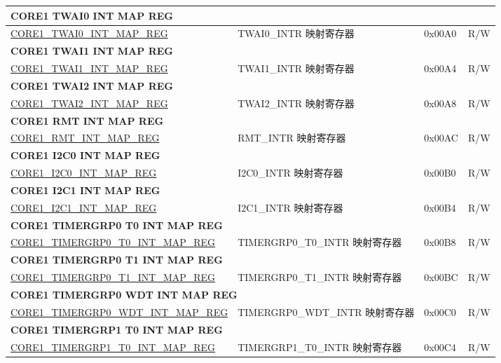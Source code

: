 \begin{longtable}{ | p{7.5cm} | p{7.2cm} | p{1.3cm} | p{1cm} | }
\multicolumn{4}{|l|}{\textbf{CORE1 TWAI0 INT MAP REG}} \\ \hline
\hyperref[regdesc:CORE1TWAI0INTMAPREG]{CORE1\_TWAI0\_INT\_MAP\_REG} & TWAI0\_INTR 映射寄存器 & 0x00A0 & R/W \\ \hline
\multicolumn{4}{|l|}{\textbf{CORE1 TWAI1 INT MAP REG}} \\ \hline
\hyperref[regdesc:CORE1TWAI1INTMAPREG]{CORE1\_TWAI1\_INT\_MAP\_REG} & TWAI1\_INTR 映射寄存器 & 0x00A4 & R/W \\ \hline
\multicolumn{4}{|l|}{\textbf{CORE1 TWAI2 INT MAP REG}} \\ \hline
\hyperref[regdesc:CORE1TWAI2INTMAPREG]{CORE1\_TWAI2\_INT\_MAP\_REG} & TWAI2\_INTR 映射寄存器 & 0x00A8 & R/W \\ \hline
\multicolumn{4}{|l|}{\textbf{CORE1 RMT INT MAP REG}} \\ \hline
\hyperref[regdesc:CORE1RMTINTMAPREG]{CORE1\_RMT\_INT\_MAP\_REG} & RMT\_INTR 映射寄存器 & 0x00AC & R/W \\ \hline
\multicolumn{4}{|l|}{\textbf{CORE1 I2C0 INT MAP REG}} \\ \hline
\hyperref[regdesc:CORE1I2C0INTMAPREG]{CORE1\_I2C0\_INT\_MAP\_REG} & I2C0\_INTR 映射寄存器 & 0x00B0 & R/W \\ \hline
\multicolumn{4}{|l|}{\textbf{CORE1 I2C1 INT MAP REG}} \\ \hline
\hyperref[regdesc:CORE1I2C1INTMAPREG]{CORE1\_I2C1\_INT\_MAP\_REG} & I2C1\_INTR 映射寄存器 & 0x00B4 & R/W \\ \hline
\multicolumn{4}{|l|}{\textbf{CORE1 TIMERGRP0 T0 INT MAP REG}} \\ \hline
\hyperref[regdesc:CORE1TIMERGRP0T0INTMAPREG]{CORE1\_TIMERGRP0\_T0\_INT\_MAP\_REG} & TIMERGRP0\_T0\_INTR 映射寄存器 & 0x00B8 & R/W \\ \hline
\multicolumn{4}{|l|}{\textbf{CORE1 TIMERGRP0 T1 INT MAP REG}} \\ \hline
\hyperref[regdesc:CORE1TIMERGRP0T1INTMAPREG]{CORE1\_TIMERGRP0\_T1\_INT\_MAP\_REG} & TIMERGRP0\_T1\_INTR 映射寄存器 & 0x00BC & R/W \\ \hline
\multicolumn{4}{|l|}{\textbf{CORE1 TIMERGRP0 WDT INT MAP REG}} \\ \hline
\hyperref[regdesc:CORE1TIMERGRP0WDTINTMAPREG]{CORE1\_TIMERGRP0\_WDT\_INT\_MAP\_REG} & TIMERGRP0\_WDT\_INTR 映射寄存器 & 0x00C0 & R/W \\ \hline
\multicolumn{4}{|l|}{\textbf{CORE1 TIMERGRP1 T0 INT MAP REG}} \\ \hline
\hyperref[regdesc:CORE1TIMERGRP1T0INTMAPREG]{CORE1\_TIMERGRP1\_T0\_INT\_MAP\_REG} & TIMERGRP1\_T0\_INTR 映射寄存器 & 0x00C4 & R/W \\ \hline

\end{longtable}
